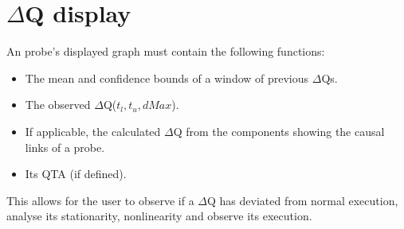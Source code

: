 \section{$\Delta$Q display}
    An probe's displayed graph must contain the following functions:
    \begin{itemize}
        \item The mean and confidence bounds of a window of previous $\Delta$Qs.
        \item The observed $\Delta$Q($t_l, t_u, dMax$).
        \item If applicable, the calculated $\Delta$Q from the components showing the causal links of a probe.
        \item Its QTA (if defined).
    \end{itemize}
    This allows for the user to observe if a $\Delta$Q has deviated from normal execution, analyse its stationarity, nonlinearity and observe its execution.

